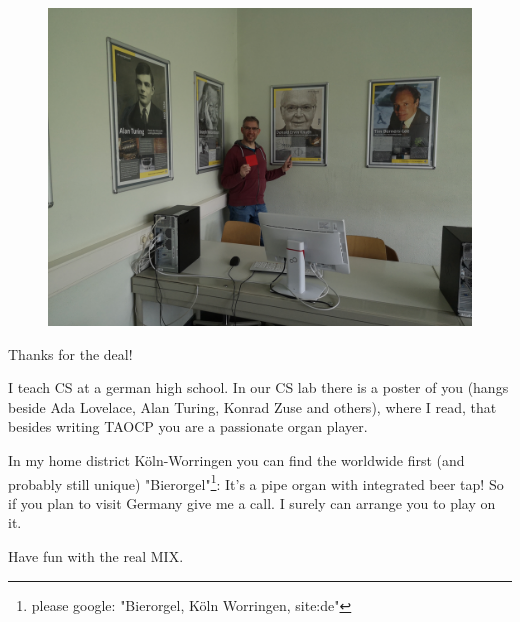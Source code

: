 \documentclass[a4paper,ngerman]{scrartcl}
\begin{document}
\vspace{5cm}



\begin{figure}[H]
	\centering
	\includegraphics[width=0.7\linewidth]{../poster}


\end{figure}


Thanks for the deal!

I teach CS at a german high school. In our CS lab there is a poster of you (hangs beside Ada Lovelace, Alan Turing, Konrad Zuse and others), where I read, that besides writing TAOCP you are a passionate organ player.

In my home district Köln-Worringen you can find the worldwide first (and probably still unique) "Bierorgel"\footnote{please google: "Bierorgel, Köln Worringen, site:de"}: It's a pipe organ with integrated beer tap! So if you plan to visit Germany give me a call. I surely can arrange you to play on it.

Have fun with the real MIX.
\end{document}
